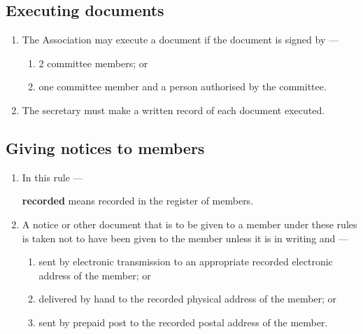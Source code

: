 \documentclass[../constitution.tex]{subfiles}
\begin{document}
\hypertarget{executing-documents}{%
\subsection{Executing documents}\label{executing-documents}}


\begin{enumerate}

\item The Association may execute a document if the document is signed by ---

  \begin{enumerate}
  
  \item 2 committee members; or
  \item one committee member and a person authorised by the committee.
  \end{enumerate}
\item The secretary must make a written record of each document executed.
\end{enumerate}

\hypertarget{giving-notices-to-members}{%
\subsection{Giving notices to members}\label{giving-notices-to-members}}

\begin{enumerate}

\item In this rule ---

  \textbf{recorded} means recorded in the register of members.

\item A notice or other document that is to be given to a member under these rules is taken not to have been given to the member unless it is in writing and ---

  \begin{enumerate}
  \item sent by electronic transmission to an appropriate recorded electronic address of the member; or 
  \item delivered by hand to the recorded physical address of the member; or
  \item sent by prepaid post to the recorded postal address of the member.
  \end{enumerate}
\end{enumerate}
\end{document}
